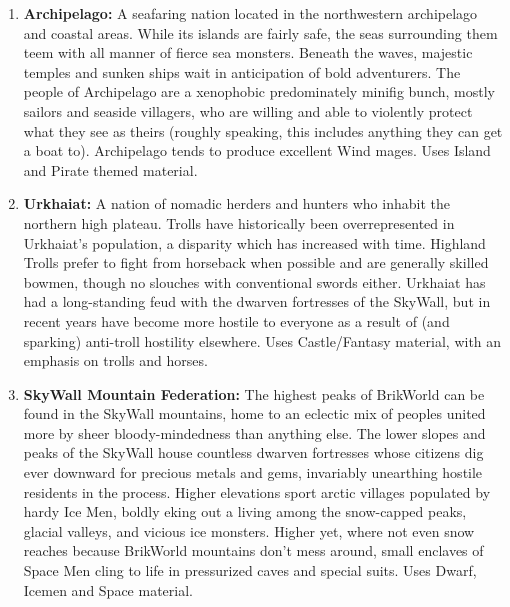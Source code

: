 \documentclass[12pt,a4paper,twocolumn]{article}
\begin{document}
\begin{enumerate}
\item {\bf Archipelago:} A seafaring nation located in the northwestern archipelago and coastal areas.  While its islands are fairly safe, the seas surrounding them teem with all manner of fierce sea monsters.  Beneath the waves, majestic temples and sunken ships wait in anticipation of bold adventurers.  The people of Archipelago are a xenophobic predominately minifig bunch, mostly sailors and seaside villagers, who are willing and able to violently protect what they see as theirs (roughly speaking, this includes anything they can get a boat to).  Archipelago tends to produce excellent Wind mages.  Uses Island and Pirate themed material.

\item {\bf Urkhaiat:} A nation of nomadic herders and hunters who inhabit the northern high plateau.  Trolls have historically been overrepresented in Urkhaiat's population, a disparity which has increased with time.  Highland Trolls prefer to fight from horseback when possible and are generally skilled bowmen, though no slouches with conventional swords either.  Urkhaiat has had a long-standing feud with the dwarven fortresses of the SkyWall, but in recent years have become more hostile to everyone as a result of (and sparking) anti-troll hostility elsewhere.  Uses Castle/Fantasy material, with an emphasis on trolls and horses.

\item {\bf SkyWall Mountain Federation:} The highest peaks of BrikWorld can be found in the SkyWall mountains, home to an eclectic mix of peoples united more by sheer bloody-mindedness than anything else.  The lower slopes and peaks of the SkyWall house countless dwarven fortresses whose citizens dig ever downward for precious metals and gems, invariably unearthing hostile residents in the process.  Higher elevations sport arctic villages populated by hardy Ice Men, boldly eking out a living among the snow-capped peaks, glacial valleys, and vicious ice monsters.  Higher yet, where not even snow reaches because BrikWorld mountains don't mess around, small enclaves of Space Men cling to life in pressurized caves and special suits.  Uses Dwarf, Icemen and Space material.


\end{enumerate}
\end{document}
